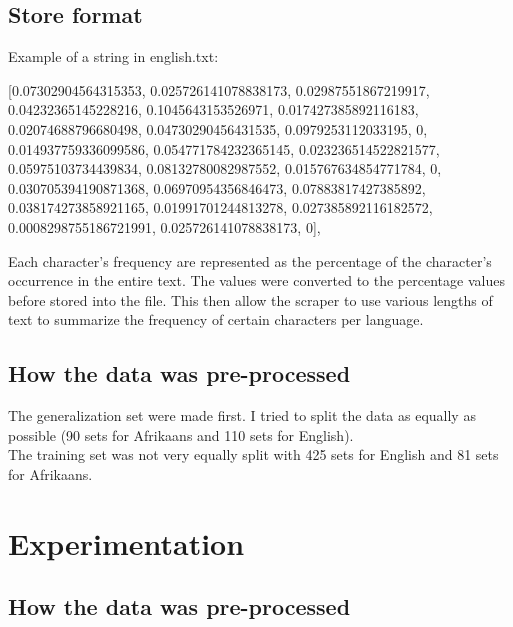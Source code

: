 \documentclass[pdftex,10pt,a4paper]{report}
\begin{document}
\section{Store format}
Example of a string in english.txt:
	\begin{center}
[0.07302904564315353, 0.025726141078838173, 0.02987551867219917, 0.04232365145228216, 0.1045643153526971, 0.017427385892116183, 0.02074688796680498, 0.04730290456431535, 0.0979253112033195, 0, 0.014937759336099586, 0.054771784232365145, 0.023236514522821577, 0.05975103734439834, 0.08132780082987552, 0.015767634854771784, 0, 0.030705394190871368, 0.06970954356846473, 0.07883817427385892, 0.038174273858921165, 0.01991701244813278, 0.027385892116182572, 0.0008298755186721991, 0.025726141078838173, 0],
	\end{center}

Each character's frequency are represented as the percentage of the character's occurrence in the entire text. The values were converted to the percentage values before stored into the file. This then allow the scraper to use various lengths of text to summarize the frequency of certain characters per language. 

\section{How the data was pre-processed}

The generalization set were made first. I tried to split the data as equally as possible (90 sets for Afrikaans and 110 sets for English). \\
The training set was not very equally split with 425 sets for English and 81 sets for Afrikaans.
				
\chapter{Experimentation}
\section{How the data was pre-processed}



\endgroup
	
\end{document}
